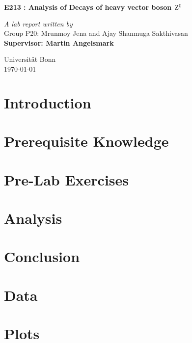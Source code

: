 \documentclass[a4paper]{report}
\begin{document}
\begin{onehalfspace}
\vspace*{0.5in}
\begin{center}
\begin{LARGE}
\textbf{E213 : Analysis of Decays of heavy vector boson $\rm Z^{0}$}\\ 
\end{LARGE}
\bigskip
\bigskip
\textit{A lab report written by}\\
Group P20: Mrunmoy Jena and Ajay Shanmuga Sakthivasan\\
\medskip
\textbf{Supervisor: Martin Angelsmark}\\
\vspace*{5in}
\begin{flushright}
Universit\"{a}t	Bonn\\
\today
\end{flushright}
\end{center}
\tableofcontents

\chapter*{Introduction}


\chapter{Prerequisite Knowledge}


\chapter{Pre-Lab Exercises}


\chapter{Analysis}


\chapter{Conclusion}


\end{onehalfspace}
\printbibliography[title = References]

\appendix
\chapter{Data}

\chapter{Plots}

\listoffigures
\listoftables
\end{document}
